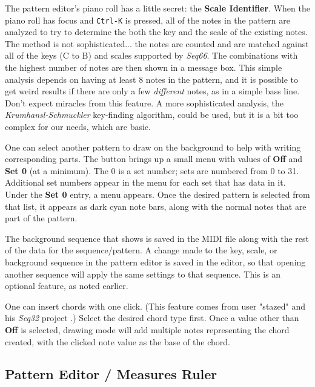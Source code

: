    The pattern editor's piano roll has a little secret:
   the \textbf{Scale Identifier}.
   When the piano roll has focus and \texttt{Ctrl-K} is pressed,
   all of the notes in the pattern are analyzed to try to determine
   the both the key and the scale of the existing notes.
   The method is not sophisticated... the notes are counted and are matched
   against all of the keys (C to B) and scales supported by \textsl{Seq66}.
   The combinations with the highest number of notes are then shown in a
   message box.
   This simple analysis depends on having at least 8 notes in the pattern, and
   it is possible to get weird results if
   there are only a few \textsl{different}
   notes, as in a simple bass line.
   Don't expect miracles from this feature.
   A more sophisticated analysis, the
   \textsl{Krumhansl-Schmuckler} key-finding
   algorithm, could be used, but it is a bit too complex
   for our needs, which are basic.

   One can select another pattern to draw on the background to help with
   writing corresponding parts.
   The button brings up a small menu with values of \textbf{Off} and
   \textbf{Set 0} (at a minimum).
   The 0 is a set number; sets are numbered from 0 to 31.
   Additional set numbers appear in the menu for each set that has data in it.
   Under the \textbf{Set 0} entry, a menu appears.
   Once the desired pattern is selected from that list, it appears as dark cyan
   note bars, along with the normal notes that are part of the pattern.

   The background sequence that shows is saved in the MIDI file
   along with the rest of the data for the sequence/pattern.
   A change made to the key, scale, or background sequence in
   the pattern editor is saved in the editor, so that opening another sequence
   will apply the same settings to that sequence.
   This is an optional feature, as noted earlier.

   One can insert chords with one click.
   (This feature comes from user "stazed"
   and his \textsl{Seq32} project \cite{seq32}.)
   Select the desired chord type first.
   Once a value other than \textbf{Off} is selected,
   drawing mode will add multiple notes representing the chord
   created, with the clicked note value as the base of the chord.

\subsection{Pattern Editor / Measures Ruler}
\label{subsec:pattern_editor_time}

